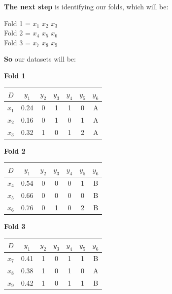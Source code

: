 \documentclass[12pt]{article}
\begin{document}
\begin{enumerate}[leftmargin=\labelsep]
\begin{enumerate}
          \textbf{The next step} is identifying our folds, which will be:
          \begin{center}
            Fold 1 = $x_1$ $x_2$ $x_3$  \\
            Fold 2 = $x_4$ $x_5$ $x_6$ \\
            Fold 3 = $x_7$ $x_8$ $x_9$ \\
          \end{center}

          \textbf{So} our datasets will be:

          \begin{center}
            \textbf{Fold 1} \\
            \begin{tabular}{c|cccccc}
                \(D\) & \(y_1\) & \(y_2\) & \(y_3\) & \(y_4\) & \(y_5\) & \(y_6\)\\
                \hline
                \(x_1\) & 0.24 & 0 & 1 & 1 & 0 & A  \\
                \(x_2\) & 0.16 & 0 & 1 & 0 & 1 & A  \\
                \(x_3\) & 0.32 & 1 & 0 & 1 & 2 & A  \\
            \end{tabular}
          \end{center}

          \begin{center}
            \textbf{Fold 2} \\
            \begin{tabular}{c|cccccc}
                \(D\) & \(y_1\) & \(y_2\) & \(y_3\) & \(y_4\) & \(y_5\) & \(y_6\)\\
                \hline
                \(x_4\) & 0.54 & 0 & 0 & 0 & 1 & B  \\
                \(x_5\) & 0.66 & 0 & 0 & 0 & 0 & B  \\
                \(x_6\) & 0.76 & 0 & 1 & 0 & 2 & B  \\
            \end{tabular}
          \end{center}

          \begin{center}
            \textbf{Fold 3} \\
            \begin{tabular}{c|cccccc}
                \(D\) & \(y_1\) & \(y_2\) & \(y_3\) & \(y_4\) & \(y_5\) & \(y_6\)\\
                \hline
                \(x_7\) & 0.41 & 1 & 0 & 1 & 1 & B  \\
                \(x_8\) & 0.38 & 1 & 0 & 1 & 0 & A  \\
                \(x_9\) & 0.42 & 1 & 0 & 1 & 1 & B  \\
            \end{tabular}
          \end{center}


\end{enumerate}
\end{enumerate}
\end{document}
